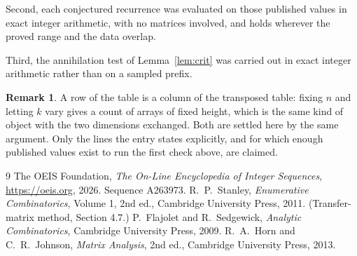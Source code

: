 \documentclass[11pt,a4paper]{article}
\theoremstyle{plain}
\theoremstyle{definition}
\newtheorem{remark}[theorem]{Remark}
\begin{document}
Second, each conjectured recurrence was evaluated on those published values in exact
integer arithmetic, with no matrices involved, and holds wherever the proved range and the
data overlap.

Third, the annihilation test of Lemma~\ref{lem:crit} was carried out in exact integer
arithmetic rather than on a sampled prefix.

\begin{remark}
A row of the table is a column of the transposed table: fixing $n$ and letting $k$ vary gives a
count of arrays of fixed height, which is the same kind of object with the two dimensions
exchanged. Both are settled here by the same argument. Only the lines the entry states
explicitly, and for which enough published values exist to run the first check above, are
claimed.
\end{remark}

\begin{thebibliography}{9}
 The OEIS Foundation, \emph{The On-Line Encyclopedia of Integer
Sequences}, \url{https://oeis.org}, 2026. Sequence A263973.
 R.~P.~Stanley, \emph{Enumerative Combinatorics}, Volume 1, 2nd ed.,
Cambridge University Press, 2011. (Transfer-matrix method, Section 4.7.)
 P.~Flajolet and R.~Sedgewick, \emph{Analytic Combinatorics}, Cambridge
University Press, 2009.
 R.~A.~Horn and C.~R.~Johnson, \emph{Matrix Analysis}, 2nd ed., Cambridge
University Press, 2013.
\end{thebibliography}
\end{document}
